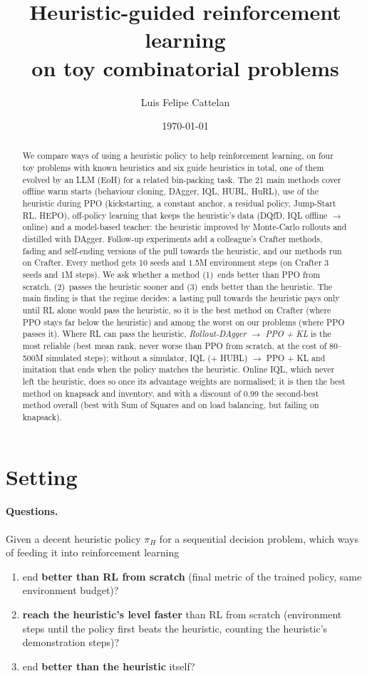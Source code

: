 \documentclass[11pt,a4paper]{article}
\title{Heuristic-guided reinforcement learning\\on toy combinatorial problems}
\author{Luis Felipe Cattelan}
\date{\today}
\begin{document}
\maketitle

\begin{abstract}
We compare ways of using a heuristic policy to help reinforcement learning, on four toy problems with known
heuristics and six guide heuristics in total, one of them evolved by an LLM (EoH) for a related bin-packing task.
The 21 main methods cover offline warm starts (behaviour cloning, DAgger, IQL, HUBL, HuRL), use of the heuristic during
PPO (kickstarting, a constant anchor, a residual policy, Jump-Start RL, HEPO), off-policy learning that keeps the
heuristic's data (DQfD, IQL offline $\to$ online) and a model-based teacher: the heuristic improved by Monte-Carlo
rollouts and distilled with DAgger. Follow-up experiments add a colleague's Crafter methods, fading and self-ending
versions of the pull towards the heuristic, and our methods run on Crafter. Every method gets 10 seeds and 1.5M
environment steps (on Crafter 3 seeds and 1M steps). We ask whether a method (1)~ends better than PPO from scratch, (2)~passes the heuristic sooner and
(3)~ends better than the heuristic. The main finding is that the regime decides: a lasting pull towards the heuristic
pays only until RL alone would pass the heuristic, so it is the best method on Crafter (where PPO stays far below the
heuristic) and among the worst on our problems (where PPO passes it). Where RL can pass the heuristic,
\emph{Rollout-DAgger $\to$ PPO + KL} is the most reliable (best mean rank, never worse than PPO from scratch, at the
cost of 80--500M simulated steps); without a simulator, IQL (+ HUBL) $\to$ PPO + KL and imitation that ends when the
policy matches the heuristic. Online IQL, which never left the heuristic, does so once its advantage weights are
normalised; it is then the best method on knapsack and inventory, and with a discount of 0.99 the second-best method
overall (best with Sum of Squares and on load balancing, but failing on knapsack).
\end{abstract}

\section{Setting}

\paragraph{Questions.} Given a decent heuristic policy $\pi_H$ for a sequential decision problem, which ways of
feeding it into reinforcement learning
\begin{enumerate}[label=\textbf{Q\arabic*}, leftmargin=*]
\item end \textbf{better than RL from scratch} (final metric of the trained policy, same environment budget)?
\item \textbf{reach the heuristic's level faster} than RL from scratch (environment steps until the policy first
  beats the heuristic, counting the heuristic's demonstration steps)?
\item end \textbf{better than the heuristic} itself?
\end{enumerate}
\end{document}
